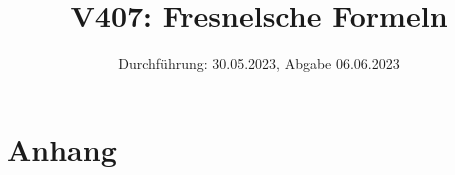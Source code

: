 

\title{V407: Fresnelsche Formeln}
\date{Durchführung: 30.05.2023, Abgabe 06.06.2023}


\maketitle
\thispagestyle{empty} 
\tableofcontents
\newpage
\setcounter{page}{1}






\printbibliography
\newpage

\section*{Anhang}


